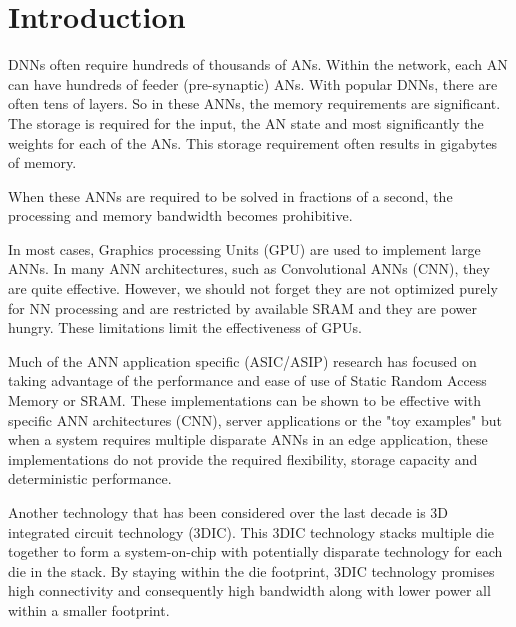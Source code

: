 \documentclass[journal]{IEEEtran}
\begin{document}
\section{Introduction}
% 
% 
% 
% 
 DNNs often require hundreds of thousands of ANs.
Within the network, each AN can have hundreds of feeder (pre-synaptic) ANs.
With popular DNNs, there are often tens of layers. 
So in these ANNs, the memory requirements are significant. The storage is required for the input, the AN state and most significantly the weights for each of the ANs. This storage requirement often results in gigabytes of memory.

When these ANNs are required to be solved in fractions of a second, the processing and memory bandwidth becomes prohibitive.

In most cases, Graphics processing Units (GPU) are used to implement large ANNs. In many ANN architectures, such as Convolutional ANNs (CNN), they are quite effective. However, we should not forget they are not optimized purely for 
NN processing and are restricted by available SRAM and they are power hungry. These limitations limit the effectiveness of GPUs.

Much of the ANN application specific (ASIC/ASIP) research has focused on taking advantage of the performance and ease of use of Static Random Access Memory or SRAM. 
These implementations can be shown to be effective with specific ANN architectures (CNN), server applications or the "toy examples" but when a system requires multiple disparate ANNs in an edge application, 
these implementations do not provide the required flexibility, storage capacity and deterministic performance.

Another technology that has been considered over the last decade is 3D integrated circuit technology (3DIC). 
This 3DIC technology stacks multiple die together to form a system-on-chip with potentially disparate technology for each die in the stack.
By staying within the die footprint, 3DIC technology promises high connectivity and consequently high bandwidth along with lower power all within a smaller footprint.
\end{document}
